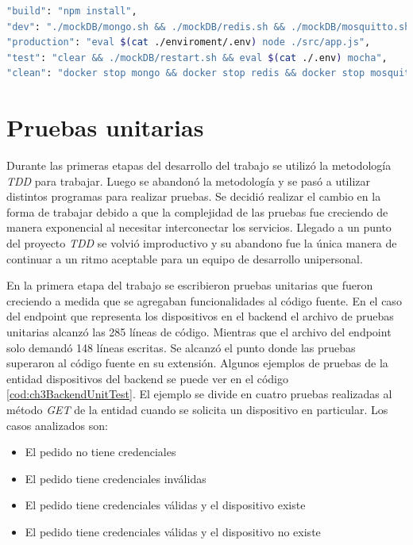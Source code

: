 \begin{lstlisting}[language=bash,label=cod:ch3GuionesNodejs,caption=Guiones de Nodejs.]
"build": "npm install",
"dev": "./mockDB/mongo.sh && ./mockDB/redis.sh && ./mockDB/mosquitto.sh && eval $(cat ./.env) nodemon ./src/app.js",
"production": "eval $(cat ./enviroment/.env) node ./src/app.js",
"test": "clear && ./mockDB/restart.sh && eval $(cat ./.env) mocha",
"clean": "docker stop mongo && docker stop redis && docker stop mosquitto"
\end{lstlisting}

\section{Pruebas unitarias}
Durante las primeras etapas del desarrollo del trabajo se utilizó la metodología \emph{TDD} para trabajar.
Luego se abandonó la metodología y se pasó a utilizar distintos programas para realizar pruebas.
Se decidió realizar el cambio en la forma de trabajar debido a que la complejidad de las pruebas fue creciendo de manera exponencial al necesitar interconectar los servicios.
Llegado a un punto del proyecto \emph{TDD} se volvió improductivo y su abandono fue la única manera de continuar a un ritmo aceptable para un equipo de desarrollo unipersonal.

En la primera etapa del trabajo se escribieron pruebas unitarias que fueron creciendo a medida que se agregaban funcionalidades al código fuente.
En el caso del endpoint que representa los dispositivos en el backend el archivo de pruebas unitarias alcanzó las 285 líneas de código.
Mientras que el archivo del endpoint solo demandó 148 líneas escritas.
Se alcanzó el punto donde las pruebas superaron al código fuente en su extensión.
Algunos ejemplos de pruebas de la entidad dispositivos del backend se puede ver en el código \ref{cod:ch3BackendUnitTest}.
El ejemplo se divide en cuatro pruebas realizadas al método \emph{GET} de la entidad cuando se solicita un dispositivo en particular.
Los casos analizados son:

\begin{itemize}
	\item El pedido no tiene credenciales
	\item El pedido tiene credenciales inválidas
	\item El pedido tiene credenciales válidas y el dispositivo existe
	\item El pedido tiene credenciales válidas y el dispositivo no existe
\end{itemize}

